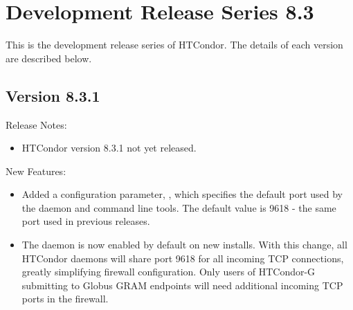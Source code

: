 
\section{\label{sec:History-8-3}Development Release Series 8.3}

This is the development release series of HTCondor.
The details of each version are described below.

\subsection*{\label{sec:New-8-3-1}Version 8.3.1}

\noindent Release Notes:

\begin{itemize}

\item HTCondor version 8.3.1 not yet released.

\end{itemize}


\noindent New Features:

\begin{itemize}

\item Added a configuration parameter, , which specifies
the default port used by the  daemon and command line tools.
The default value is 9618 - the same port used in previous releases.

\item The  daemon is now enabled by default on new installs.
With this change, all HTCondor daemons will share port 9618 for all incoming TCP
connections, greatly simplifying firewall configuration.  Only users of HTCondor-G
submitting to Globus GRAM endpoints will need additional incoming TCP ports in
the firewall.

\end{itemize}

